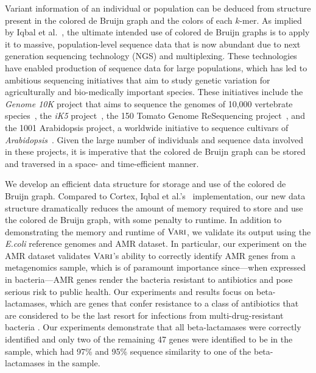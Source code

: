 Variant information of an individual or population can be deduced from structure present in the colored de Bruijn graph and the colors of each $k$-mer.
As implied by Iqbal et al.~\cite{ICTFM12}, the ultimate intended use of colored de Bruijn graphs is to apply it to massive, population-level sequence data that is now abundant due to next generation sequencing technology (NGS) and multiplexing. These technologies have enabled production of sequence data for large populations, which has led to ambitious sequencing initiatives that aim to study genetic variation for agriculturally and bio-medically important species.  These initiatives include the {\em Genome 10K} project that aims to sequence the genomes of 10,000 vertebrate species~\cite{Haussler:2009}, the {\em iK5} project~\cite{Robinson:2011}, the 150 Tomato Genome ReSequencing project~\cite{tomato1,tomato2}, and the 1001 Arabidopsis project, a worldwide initiative to sequence cultivars of {\em Arabidopsis}~\cite{arabidopsis}.   Given the large number of individuals and sequence data involved in these projects, it is imperative that the colored de Bruijn graph can be stored and traversed in a space- and time-efficient manner.


We develop an efficient data structure for storage and use of the colored de Bruijn graph. Compared to {\sc Cortex}, Iqbal et al.'s~\cite{ICTFM12} implementation, our new data structure dramatically reduces the amount of memory required to store and use the colored de Bruijn graph, with some penalty to runtime. In addition to demonstrating the memory and runtime of $\mbox{\rm {\sc Vari}}$, we validate its output using the {\em E.coli} reference genomes and AMR dataset.  In particular, our experiment on the AMR dataset validates $\mbox{\rm {\sc Vari}}$'s ability to correctly identify AMR genes from a metagenomics sample, which  is of paramount importance since---when expressed in bacteria---AMR genes render the bacteria resistant to antibiotics and pose serious risk to public health.  Our experiments and results focus on beta-lactamases, which are genes that confer resistance to a class of antibiotics that are considered to be the last resort for infections from multi-drug-resistant bacteria \cite{mckenna,carbapenem_review}.  Our experiments demonstrate that all  beta-lactamases were correctly identified and only two of the remaining 47 genes were identified to be in the sample, which had 97\% and 95\% sequence similarity to one of the beta-lactamases in the sample.

